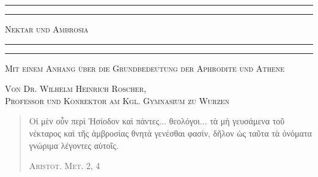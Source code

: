 \documentclass[a4paper, 11pt, oneside]{article}
\begin{document}
\begin{titlepage} %
	\centering %

	
	\rule{\textwidth}{1.6pt}\vspace*{-\baselineskip}\vspace*{2pt} %
	\rule{\textwidth}{0.4pt} %
	
	\vspace{1\baselineskip} %
	
	{\scshape\Huge Nektar und Ambrosia}
	
	\vspace{1\baselineskip} %

	\rule{\textwidth}{0.4pt}\vspace*{-\baselineskip}\vspace{3.2pt} %
	\rule{\textwidth}{1.6pt} %
	
	\vspace{1\baselineskip} %
	
	
	{\scshape \Large Mit einem Anhang über die Grundbedeutung der Aphrodite und Athene} %
	
	\vspace*{1\baselineskip} %

        {\scshape Von \Large Dr. Wilhelm Heinrich Roscher,\\\normalsize Professor und Konrektor am Kgl. Gymnasium zu Wurzen}

	\vspace*{4\baselineskip} %

        \begin{quotation}
        \centering
        
        Οἱ μὲν οὖν περὶ Ἡσίοδον καὶ πάντες... θεολόγοι... τὰ μὴ γευσάμενα τοῦ νέκταρος καὶ τῆς ἀμβροσίας θνητὰ γενέσθαι φασίν, δῆλον ὡς ταῦτα τὰ ὀνόματα γνώριμα λέγοντες αὑτοῖς.
        
        \scshape Aristot. Met. 2, 4
        \end{quotation}


\end{titlepage}
\end{document}
